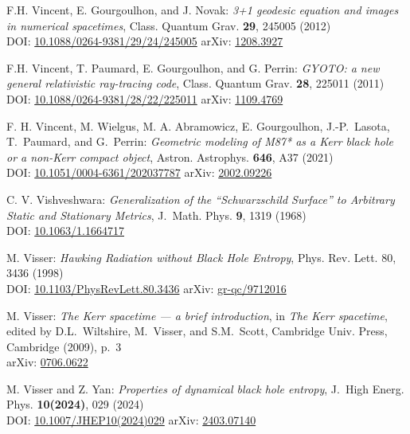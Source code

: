 \begin{thebibliography}{123}
F.H. Vincent, E. Gourgoulhon, and J. Novak:
{\em 3+1 geodesic equation and images in numerical spacetimes},
Class. Quantum Grav. {\bf 29}, 245005 (2012)\\
DOI: \href{https://doi.org/10.1088/0264-9381/29/24/245005}{10.1088/0264-9381/29/24/245005}\hfill
arXiv: \href{https://arxiv.org/abs/1208.3927}{1208.3927}

F.H. Vincent, T. Paumard, E. Gourgoulhon, and G. Perrin:
{\em GYOTO: a new general relativistic ray-tracing code},
Class. Quantum Grav. {\bf 28}, 225011 (2011)\\
DOI: \href{https://doi.org/10.1088/0264-9381/28/22/225011}{10.1088/0264-9381/28/22/225011}
\hfill
arXiv: \href{https://arxiv.org/abs/1109.4769}{1109.4769}

F. H. Vincent, M. Wielgus, M. A. Abramowicz, E. Gourgoulhon, J.-P.~Lasota, T.~Paumard,
and G.~Perrin:
{\em Geometric modeling of M87* as a Kerr black hole or a non-Kerr compact object},
Astron. Astrophys. {\bf 646}, A37 (2021)\\
DOI: \href{https://doi.org/10.1051/0004-6361/202037787}{10.1051/0004-6361/202037787}\hfill
arXiv: \href{https://arxiv.org/abs/2002.09226}{2002.09226}

C. V. Vishveshwara:
{\em Generalization of the ``Schwarzschild Surface'' to Arbitrary Static and Stationary Metrics},
J.~Math. Phys. {\bf 9}, 1319 (1968)\\
DOI: \href{https://doi.org/10.1063/1.1664717}{10.1063/1.1664717}

M. Visser: {\em Hawking Radiation without Black Hole Entropy},
Phys. Rev. Lett. 80, 3436 (1998)\\
DOI: \href{https://doi.org/10.1103/PhysRevLett.80.3436}{10.1103/PhysRevLett.80.3436}\hfill
arXiv: \href{https://arxiv.org/abs/gr-qc/9712016}{gr-qc/9712016}

M. Visser: {\em The Kerr spacetime --- a brief introduction},
in {\em The Kerr spacetime}, edited by D.L.~Wiltshire, M.~Visser, and S.M.~Scott,
Cambridge Univ. Press, Cambridge (2009), p.~3\\
arXiv: \href{https://arxiv.org/abs/0706.0622}{0706.0622}

M. Visser and Z. Yan:
{\em Properties of dynamical black hole entropy},
J.~High Energ. Phys. {\bf 10(2024)}, 029 (2024)\\
DOI: \href{https://doi.org/10.1007/JHEP10(2024)029}{10.1007/JHEP10(2024)029}\hfill
arXiv: \href{https://arxiv.org/abs/2403.07140}{2403.07140}


\end{thebibliography}
